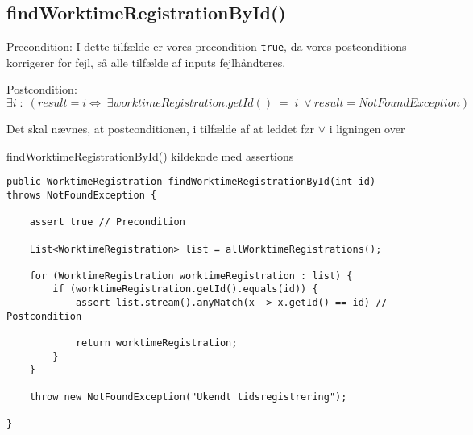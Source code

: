 \subsection{findWorktimeRegistrationById()} \label{sec:contract_findd_work}
\noindent Precondition: I dette tilfælde er vores precondition \texttt{true}, da vores postconditions korrigerer for fejl, så alle tilfælde af inputs fejlhåndteres.



\noindent
Postcondition: 
\begin{equation}
    \exists i\; :\; (result = i \iff\; \exists worktimeRegistration.getId() \; = \; i\; \lor result = NotFoundException)
\end{equation}\label{postcondition 1}

Det skal nævnes, at postconditionen, i tilfælde af at leddet før $\lor$ i ligningen over 


\begin{listing}[H]
    \centering
    \caption{findWorktimeRegistrationById() kildekode med assertions}\label{lst:find_work_time_registration_by_id_assertions}
    \begin{verbatim}
public WorktimeRegistration findWorktimeRegistrationById(int id) throws NotFoundException {

    assert true // Precondition
    
    List<WorktimeRegistration> list = allWorktimeRegistrations();

    for (WorktimeRegistration worktimeRegistration : list) {
        if (worktimeRegistration.getId().equals(id)) {
            assert list.stream().anyMatch(x -> x.getId() == id) // Postcondition
            
            return worktimeRegistration;
        }
    }

    throw new NotFoundException("Ukendt tidsregistrering");

}
    \end{verbatim}
\end{listing}


